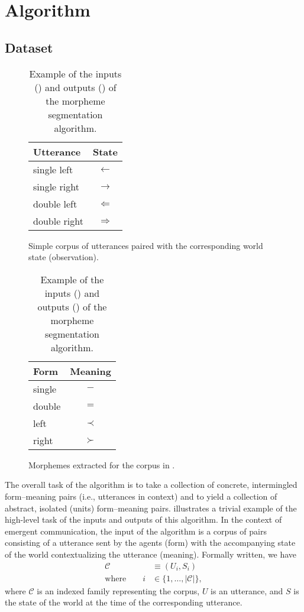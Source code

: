 \section{Algorithm}
\unskip\label{morph:sec:algorithm}

\subsection{Dataset}
\begin{table}
  \centering
  \hfill
  \begin{subfigure}[t]{0.4\linewidth}
    \centering
    \begin{tabular}{lc}
      \toprule
      Utterance & State \\
      \midrule
      single left & $\leftarrow$ \\
      single right & $\rightarrow$ \\
      double left & $\Leftarrow$ \\
      double right & $\Rightarrow$ \\
      \bottomrule
    \end{tabular}
    \caption{Simple corpus of utterances paired with the corresponding world state (observation).}
    \unskip\label{tab:seg-corp}
  \end{subfigure}
  \hfill
  \begin{subfigure}[t]{0.4\linewidth}
    \centering
    \begin{tabular}{lc}
      \toprule
      Form & Meaning \\
      \midrule
      single & $-$ \\
      double & $=$ \\
      left & $\prec$ \\
      right & $\succ$ \\
      \bottomrule
    \end{tabular}
    \caption{Morphemes extracted for the corpus in .}
    \unskip\label{tab:seg-morph}
  \end{subfigure}
  \hfill
  \caption{Example of the inputs () and outputs () of the morpheme segmentation algorithm.}
  \unskip\label{tab:seg-example}
\end{table}


The overall task of the algorithm is to take a collection of concrete, intermingled form--meaning pairs (i.e., utterances in context) and to yield a collection of abstract, isolated (units) form--meaning pairs.
 illustrates a trivial example of the high-level task of the inputs and outputs of this algorithm.
In the context of emergent communication, the input of the algorithm is a corpus of pairs consisting of a utterance sent by the agents (form) with the accompanying state of the world contextualizing the utterance (meaning).
Formally written, we have
\begin{align}
  \mathcal C &\equiv (U_i, S_i) \\
  \text{where}\quad\quad i &\in \{1,\dots,|\mathcal C|\}
  ,
\end{align}
where $\mathcal C$ is an indexed family representing the corpus, $U$ is an utterance, and $S$ is the state of the world at the time of the corresponding utterance.

